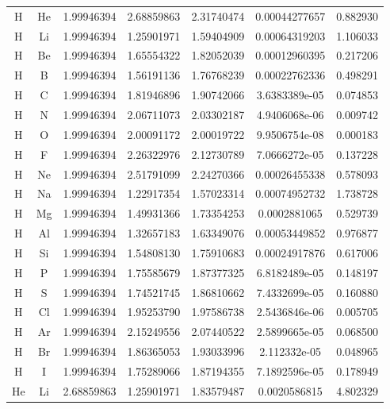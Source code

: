 \begin{longtable}{@{}ccccccc@{}}
H  &  He    &     1.99946394   &   2.68859863  &    2.31740474 &  0.00044277657  &  0.882930\\
H  &  Li    &     1.99946394   &   1.25901971  &    1.59404909 &  0.00064319203  &  1.106033\\
H  &  Be    &     1.99946394   &   1.65554322  &    1.82052039 &  0.00012960395  &  0.217206\\
H  &  B     &     1.99946394   &   1.56191136  &    1.76768239 &  0.00022762336  &  0.498291\\
H  &  C     &     1.99946394   &   1.81946896  &    1.90742066 &  3.6383389e-05  &  0.074853\\
H  &  N     &     1.99946394   &   2.06711073  &    2.03302187 &  4.9406068e-06  &  0.009742\\
H  &  O     &     1.99946394   &   2.00091172  &    2.00019722 &  9.9506754e-08  &  0.000183\\
H  &  F     &     1.99946394   &   2.26322976  &    2.12730789 &  7.0666272e-05  &  0.137228\\
H  &  Ne    &     1.99946394   &   2.51791099  &    2.24270366 &  0.00026455338  &  0.578093\\
H  &  Na    &     1.99946394   &   1.22917354  &    1.57023314 &  0.00074952732  &  1.738728\\
H  &  Mg    &     1.99946394   &   1.49931366  &    1.73354253 &   0.0002881065  &  0.529739\\
H  &  Al    &     1.99946394   &   1.32657183  &    1.63349076 &  0.00053449852  &  0.976877\\
H  &  Si    &     1.99946394   &   1.54808130  &    1.75910683 &  0.00024917876  &  0.617006\\
H  &  P     &     1.99946394   &   1.75585679  &    1.87377325 &  6.8182489e-05  &  0.148197\\
H  &  S     &     1.99946394   &   1.74521745  &    1.86810662 &  7.4332699e-05  &  0.160880\\
H  &  Cl    &     1.99946394   &   1.95253790  &    1.97586738 &  2.5436846e-06  &  0.005705\\
H  &  Ar    &     1.99946394   &   2.15249556  &    2.07440522 &  2.5899665e-05  &  0.068500\\
H  &  Br    &     1.99946394   &   1.86365053  &    1.93033996 &   2.112332e-05  &  0.048965\\
H  &  I     &     1.99946394   &   1.75289066  &    1.87194355 &  7.1892596e-05  &  0.178949\\
He &  Li    &     2.68859863   &   1.25901971  &    1.83579487 &   0.0020586815  &  4.802329\\

\end{longtable}
